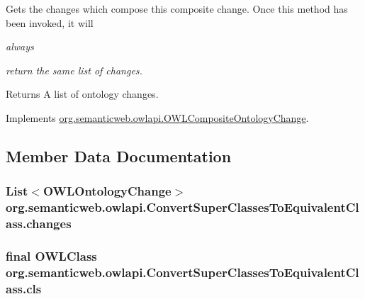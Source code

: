 Gets the changes which compose this composite change. Once this method has been invoked, it will {\itshape always{\itshape  return the same list of changes. \begin{DoxyReturn}{Returns}
A list of ontology changes. 
\end{DoxyReturn}
}}

Implements \hyperlink{interfaceorg_1_1semanticweb_1_1owlapi_1_1_o_w_l_composite_ontology_change_a047d3f540ac840c0ac0285bc576636d2}{org.\-semanticweb.\-owlapi.\-O\-W\-L\-Composite\-Ontology\-Change}.



\subsection{Member Data Documentation}
\hypertarget{classorg_1_1semanticweb_1_1owlapi_1_1_convert_super_classes_to_equivalent_class_a93ab812fd4585b2d0b0e22a90a59b93d}{
\subsubsection[{changes}]{\setlength{\rightskip}{0pt plus 5cm}List$<${\bf O\-W\-L\-Ontology\-Change}$>$ org.\-semanticweb.\-owlapi.\-Convert\-Super\-Classes\-To\-Equivalent\-Class.\-changes\hspace{0.3cm}{\ttfamily [private]}}}\label{classorg_1_1semanticweb_1_1owlapi_1_1_convert_super_classes_to_equivalent_class_a93ab812fd4585b2d0b0e22a90a59b93d}
\hypertarget{classorg_1_1semanticweb_1_1owlapi_1_1_convert_super_classes_to_equivalent_class_a38215d387a59bf28b0f25523b094542d}{
\subsubsection[{cls}]{\setlength{\rightskip}{0pt plus 5cm}final {\bf O\-W\-L\-Class} org.\-semanticweb.\-owlapi.\-Convert\-Super\-Classes\-To\-Equivalent\-Class.\-cls\hspace{0.3cm}{\ttfamily [private]}}}\label{classorg_1_1semanticweb_1_1owlapi_1_1_convert_super_classes_to_equivalent_class_a38215d387a59bf28b0f25523b094542d}
